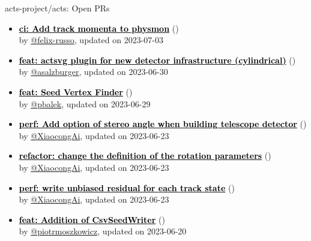 \begin{frame}[allowframebreaks]{ acts-project/acts: Open PRs
}
\begin{itemize}
    \item\iss\textbf{\href{https://github.com/acts-project/acts/pull/2221}{\textcolor{black}{ci: Add track momenta to physmon}}}
    (\href{https://github.com/acts-project/acts/pull/2221}{}) \\
    by \href{https://github.com/felix-russo}{@felix-russo}, updated on 2023-07-03

    \item\iss\textbf{\href{https://github.com/acts-project/acts/pull/2228}{\textcolor{black}{feat: actsvg plugin for new detector infrastructure (cylindrical)}}}
    (\href{https://github.com/acts-project/acts/pull/2228}{}) \\
    by \href{https://github.com/asalzburger}{@asalzburger}, updated on 2023-06-30

    \item\iss\textbf{\href{https://github.com/acts-project/acts/pull/2038}{\textcolor{black}{feat: Seed Vertex Finder}}}
    (\href{https://github.com/acts-project/acts/pull/2038}{}) \\
    by \href{https://github.com/pbalek}{@pbalek}, updated on 2023-06-29

    \item\iss\textbf{\href{https://github.com/acts-project/acts/pull/2240}{\textcolor{black}{perf: Add option of stereo angle when building telescope detector}}}
    (\href{https://github.com/acts-project/acts/pull/2240}{}) \\
    by \href{https://github.com/XiaocongAi}{@XiaocongAi}, updated on 2023-06-23

    \item\iss\textbf{\href{https://github.com/acts-project/acts/pull/2021}{\textcolor{black}{refactor: change the definition of the rotation parameters}}}
    (\href{https://github.com/acts-project/acts/pull/2021}{}) \\
    by \href{https://github.com/XiaocongAi}{@XiaocongAi}, updated on 2023-06-23

    \item\iss\textbf{\href{https://github.com/acts-project/acts/pull/2238}{\textcolor{black}{perf: write unbiased residual for each track state}}}
    (\href{https://github.com/acts-project/acts/pull/2238}{}) \\
    by \href{https://github.com/XiaocongAi}{@XiaocongAi}, updated on 2023-06-23

    \item\iss\textbf{\href{https://github.com/acts-project/acts/pull/2003}{\textcolor{black}{feat: Addition of CsvSeedWriter}}}
    (\href{https://github.com/acts-project/acts/pull/2003}{}) \\
    by \href{https://github.com/piotrmoszkowicz}{@piotrmoszkowicz}, updated on 2023-06-20

    
  \end{itemize}

\end{frame}








